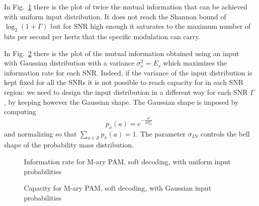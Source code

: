 \documentclass[10pt]{article}
\newlength\fheight
\newlength\fwidth
\begin{document}
In Fig.~\ref{fig:info_uni} there is the plot of twice the mutual information that can be achieved with uniform input distribution. It does not reach the Shannon bound of $\log_2(1+\Gamma)$ but for SNR high enough it saturates to the maximum number of bits per second per hertz that the specific modulation can carry. 

In Fig.~\ref{fig:info_gauss} there is the plot of the mutual information obtained using an input with Gaussian distribution with a variance $\sigma_x^2 = E_s$ which maximizes the information rate for each SNR. Indeed, if the variance of the input distribution is kept fixed for all the SNRs it is not possible to reach capacity for in each SNR region: we need to design the input distribution in a different way for each SNR $\Gamma$, by keeping however the Gaussian shape. The Gaussian shape is imposed by computing
\begin{equation}
	p_x(a) = e^{-\frac{a^2}{2\sigma_{IN}^2}}
\end{equation}
and normalizing so that $\sum_{a \in \mathcal{S}} p_x(a) = 1$. The parameter $\sigma_{IN}$ controls the bell shape of the probability mass distribution.

\begin{figure}[t]
\centering
\setlength{}
\setlength{}

\caption{Information rate for M-ary PAM, soft decoding, with uniform input probabilities}
\label{fig:info_uni}
\end{figure}
\begin{figure}[t]
\centering
\setlength{}
\setlength{}

\caption{Capacity for M-ary PAM, soft decoding, with Gaussian input probabilities}
\label{fig:info_gauss}
\end{figure}

\begin{figure*}[t]
\centering
{}
\hfil
{}
\end{figure*}
\end{document}
